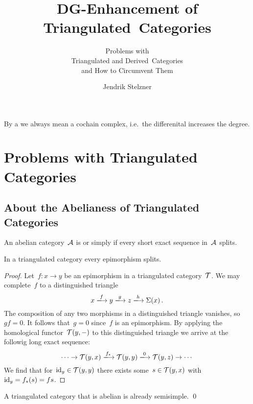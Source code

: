 \documentclass[a4paper,10pt]{scrartcl}
\title{DG-Enhancement of Triangulated~Categories}
\subtitle{Problems with \\ Triangulated and Derived~Categories \\ and How to Circumvent Them}
\author{Jendrik Stelzner}
\date{}
\begin{document}
\maketitle

\vspace{-1em}





By a  we always mean a cochain complex, i.e.\ the differenital increases the degree.





\section{Problems with Triangulated Categories}



\subsection{About the Abelianess of Triangulated Categories}

\begin{definition}
  An abelian category~$\mathcal{A}$ is  or simply  if every short exact sequence in~$\mathcal{A}$ splits.
\end{definition}

\begin{lemma}
  \label{epi in triangulated splits}
  In a triangulated category every epimorphism splits.
\end{lemma}

\begin{proof}
  Let~$f \colon x \to y$ be an epimorphism in a triangulated category~$\mathcal{T}$.
  We may complete~$f$ to a distinguished triangle
  \[
    x
    \xlongto{f}
    y
    \xlongto{g}
    z
    \xlongto{h}
    \Sigma(x) \,.
  \]
  The composition of any two morphisms in a distinguished triangle vanishes, so~$gf = 0$.
  It follows that~$g = 0$ since~$f$ is an epimorphism.
  By applying the homological functor~$\mathcal{T}(y,-)$ to this distinguished triangle we arrive at the followig long exact sequence:
  \[
    \dotsb
    \to
    \Tcat(y,x)
    \xlongto{f_*}
    \Tcat(y,y)
    \xlongto{0}
    \Tcat(y,z)
    \to
    \dotsb
  \]
  We find that for~$\mathrm{id}_y \in \mathcal{T}(y,y)$ there exists some~$s \in \mathcal{T}(y,x)$ with~$\mathrm{id}_y = f_*(s) = fs$.
\end{proof}

\begin{corollary}
  \label{triangulated abelian is semisimple}
  A triangulated category that is abelian is already semisimple.
  \qed
\end{corollary}
\end{document}
